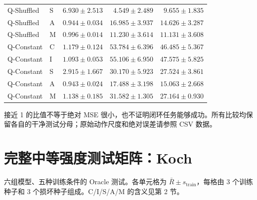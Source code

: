 \documentclass[11pt,a4paper,fontset=fandol]{ctexart}
\newcommand{\note}[1]{\begin{tcolorbox}[colback=panel,colframe=rule,boxrule=0.5pt,arc=1mm]#1\end{tcolorbox}}
\begin{document}
\begin{center}
\begin{tabular}{llrrr}
Q-Shuffled & S & $6.930\pm2.513$ & $4.549\pm2.489$ & $9.655\pm1.835$ \\
Q-Shuffled & A & $0.944\pm0.034$ & $16.985\pm3.937$ & $14.626\pm3.287$ \\
Q-Shuffled & M & $0.996\pm0.014$ & $11.230\pm3.614$ & $11.131\pm3.608$ \\
Q-Constant & C & $1.179\pm0.124$ & $53.784\pm6.396$ & $46.485\pm5.367$ \\
Q-Constant & I & $1.093\pm0.053$ & $55.106\pm6.950$ & $47.575\pm5.825$ \\
Q-Constant & S & $2.915\pm1.667$ & $30.170\pm5.923$ & $27.524\pm3.861$ \\
Q-Constant & A & $0.943\pm0.024$ & $17.488\pm3.198$ & $15.063\pm2.668$ \\
Q-Constant & M & $1.138\pm0.185$ & $31.582\pm1.305$ & $27.164\pm0.930$ \\
\bottomrule
\end{tabular}
\end{center}
\note{接近 1 的比值不等于绝对 MSE 很小，也不证明闭环任务能够成功。所有比较均保留各自的干净测试分母；原始动作尺度和绝对误差请参照 CSV 数据。}
\clearpage\section{完整中等强度测试矩阵：Koch}
六组模型、五种训练条件的 Oracle 测试。各单元格为 $\bar R\pm s_{\mathrm{train}}$，每格由 3 个训练种子和 3 个损坏种子组成。C/I/S/A/M 的含义见第 2 节。
\end{document}
